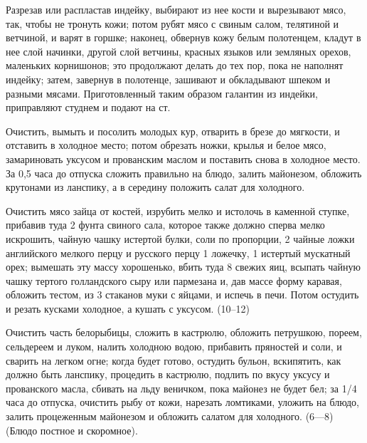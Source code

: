 
Разрезав или распластав индейку, выбирают из нее кости и вырезывают мясо, так, чтобы не тронуть кожи; потом рубят мясо с свиным салом, телятиной и ветчиной, и варят в горшке; наконец, обвернув кожу белым полотенцем, кладут в нее слой начинки, другой слой ветчины, красных языков или земляных орехов, маленьких корнишонов; это продолжают делать до тех пор, пока не наполнят индейку; затем, завернув в полотенце, зашивают и обкладывают шпеком и разными мясами. Приготовленный таким образом галантин из индейки, приправляют студнем и подают на ст. 


Очистить, вымыть и посолить молодых кур, отварить в брезе до мягкости, и отставить в холодное место; потом обрезать ножки, крылья и белое мясо, замариновать уксусом и прованским маслом и поставить снова в холодное место. За 0,5 часа до отпуска сложить правильно на блюдо, залить майонезом, обложить крутонами из ланспику, а в середину положить салат для холодного. 


Очистить мясо зайца от костей, изрубить мелко и истолочь в каменной ступке, прибавив туда 2 фунта свиного сала, которое также должно сперва мелко искрошить, чайную чашку истертой булки, соли по пропорции, 2 чайные ложки английского мелкого перцу и русского перцу 1 ложечку, 1 истертый мускатный орех; вымешать эту массу хорошенько, вбить туда 8 свежих яиц, всыпать чайную чашку тертого голландского сыру или пармезана и, дав массе форму каравая, обложить тестом, из 3 стаканов муки с яйцами, и испечь в печи. Потом остудить и резать кусками холодное, а кушать с уксусом. (10--12) 


Очистить часть белорыбицы, сложить в кастрюлю, обложить петрушкою, пореем, сельдереем и луком, налить холодною водою, прибавить пряностей и соли, и сварить на легком огне; когда будет готово, остудить бульон, вскипятить, как должно быть ланспику, процедить в кастрюлю, подлить по вкусу уксусу и прованского масла, сбивать на льду веничком, пока майонез не будет бел; за 1/4 часа до отпуска, очистить рыбу от кожи, нарезать ломтиками, уложить на блюдо, залить процеженным майонезом и обложить салатом для холодного. (6—8) (Блюдо постное и скоромное). 


